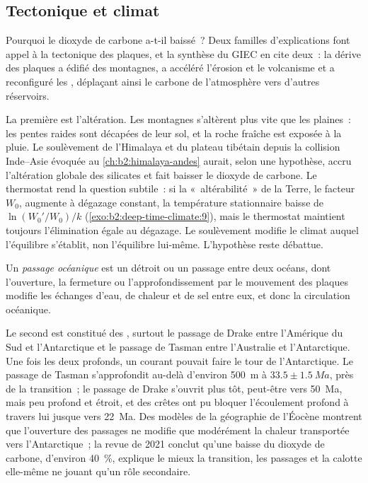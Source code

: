 \subsection*{Tectonique et climat}

Pourquoi le dioxyde de carbone a-t-il baissé~? Deux familles d'explications font appel à la tectonique des plaques, et la synthèse
du GIEC en cite deux~: la dérive des plaques a édifié des montagnes, a accéléré l'érosion et le volcanisme et
a reconfiguré les , déplaçant ainsi le carbone de l'atmosphère vers d'autres réservoirs.

La première est l'altération. Les montagnes s'altèrent plus vite que les plaines~: les pentes raides sont décapées de
leur sol, et la roche fraîche est exposée à la pluie. Le soulèvement de l'Himalaya et du plateau tibétain depuis
la collision Inde--Asie évoquée au \cref{ch:b2:himalaya-andes} aurait, selon une hypothèse, accru l'altération globale des
silicates et fait baisser le dioxyde de carbone. Le thermostat rend la question subtile~: si la
«~altérabilité~» de la Terre, le facteur $W_0$, augmente à dégazage constant, la température stationnaire
baisse de $\ln(W_0'/W_0)/k$ (\cref{exo:b2:deep-time-climate:9}), mais le thermostat maintient toujours
l'élimination égale au dégazage. Le soulèvement modifie le climat auquel l'équilibre s'établit, non l'équilibre
lui-même. L'hypothèse reste débattue.

\begin{definition}\label{def:b2:deep-time-climate:gateway}
Un \emph{passage océanique} est un détroit ou un passage entre deux océans, dont l'ouverture,
la fermeture ou l'approfondissement par le mouvement des plaques modifie les échanges d'eau, de chaleur et de sel entre eux, et
donc la circulation océanique.
\end{definition}

Le second est constitué des , surtout le passage de Drake entre l'Amérique du Sud et l'Antarctique
et le passage de Tasman entre l'Australie et l'Antarctique. Une fois les deux profonds, un courant pouvait faire
le tour de l'Antarctique. Le passage de Tasman s'approfondit au-delà d'environ \qty{500}{m} à $33.5 \pm
\qty{1.5}{Ma}$, près de la transition~; le passage de Drake s'ouvrit plus tôt, peut-être vers \qty{50}{Ma},
mais peu profond et étroit, et des crêtes ont pu bloquer l'écoulement profond à travers lui jusque vers \qty{22}{Ma}. Des modèles
de la géographie de l'Éocène montrent que l'ouverture des passages ne modifie que modérément la chaleur transportée vers
l'Antarctique~; la revue de 2021 conclut qu'une baisse du dioxyde de carbone, d'environ
\qty{40}{\percent}, explique le mieux la transition, les passages et la calotte elle-même ne jouant qu'un
rôle secondaire.

